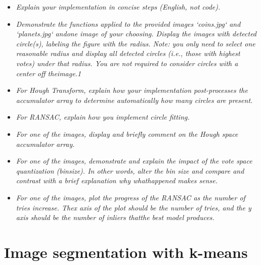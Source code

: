 \documentclass[11pt]{article}
\begin{document}
    \begin{itemize}
    \item \textit{Explain your implementation in concise steps (English, not code).}
    \text{}

    \item \textit{Demonstrate the functions applied to the provided images ‘coins.jpg‘ and ‘planets.jpg‘ andone image of your choosing.
    Display the images with detected circle(s), labeling the figure with the radius. Note: you only need to select one reasonable radius and
    display all detected circles (i.e., those with highest votes) under that radius. You are not required to consider circles with a center off
    theimage.1}
    \text{}

    \item \textit{For Hough Transform, explain how your implementation post-processes the
    accumulator array to determine automatically how many circles are present.}
    \text{}

    \item \textit{For RANSAC, explain how you implement circle fitting.}
    \text{}

    \item \textit{For one of the images, display and briefly comment on the Hough space accumulator array.}
    \text{}

    \item \textit{For one of the images, demonstrate and explain the impact of the vote space quantization (binsize). In other words, alter
    the bin size and compare and contrast with a brief explanation why whathappened makes sense.}
    \text{}

    \item \textit{For one of the images, plot the progress of the RANSAC as the number of tries increase. Thex axis
    of the plot should be
    the number of tries, and the y axis should be the number of inliers thatthe best model produces.}
    \text{}

    \end{itemize}

    \section{Image segmentation with k-means}
\end{document}
